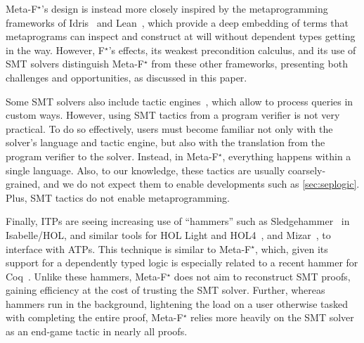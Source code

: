 \documentclass[runningheads]{llncs}
\newcommand\fstar{F$^\star$\xspace}
\newcommand\metafstar{Meta-F$^\star$\xspace}
\newcommand{\comm}[3]{\ifcheckpagebudget\else\ifdraft{{\color{#1}[#2: #3]}}\fi\fi}
\newcommand{\ch}[1]{\comm{teal}{CH}{#1}}
\newcommand{\cpc}[1]{\comm{brown}{Cl\'ement}{#1}}
\begin{document}
%
\metafstar's design is instead more closely inspired by the
metaprogramming frameworks of Idris~\cite{ChristiansenB16} and
Lean~\cite{EbnerURAM17}, which provide a deep embedding of terms that
metaprograms can inspect and construct at will without dependent types
getting in the way.
However, \fstar's effects, its weakest precondition calculus, and its
use of SMT solvers distinguish \metafstar from these other frameworks,
presenting both challenges and opportunities, as discussed in this
paper.



Some SMT solvers also include tactic engines~\cite{smttactics},
which allow to process queries in custom ways.
%
However, using SMT tactics from a program verifier is not very
practical.
%
To do so effectively, users must become familiar not only with the
solver's language and tactic engine, but also with the translation from
the program verifier to the solver.
%
Instead, in \metafstar, everything happens within a single language.
%
Also, to our knowledge, these tactics are usually coarsely-grained,
and we do not expect them to enable developments such as
\autoref{sec:seplogic}.
%
Plus, SMT tactics do not enable metaprogramming.



Finally, ITPs are seeing increasing use of ``hammers'' such as
Sledgehammer~\cite{BlanchetteBP13, PaulsonB10, Blanchette013} in
Isabelle/HOL, and similar tools for HOL Light and
HOL4~\cite{KaliszykU14}, and Mizar~\cite{KaliszykU15a}, to interface
with ATPs.
%
This technique is similar to \metafstar, which, given its support for
a dependently typed logic is especially related to a recent hammer for
Coq~\cite{CzajkaK17}. Unlike these hammers, \metafstar does not aim to
reconstruct SMT proofs, gaining efficiency at the cost of trusting the
SMT solver. Further, whereas hammers run in the background, lightening
the load on a user otherwise tasked with completing the entire
proof, \metafstar relies more heavily on the SMT solver as an end-game
tactic in nearly all proofs.
\end{document}
